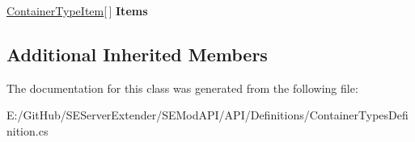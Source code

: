 \begin{DoxyCompactItemize}
\item 
\hypertarget{class_s_e_mod_a_p_i_1_1_a_p_i_1_1_definitions_1_1_container_types_definition_adcf9ddc9b999369504ad95f6d15fac98}{}\hyperlink{class_s_e_mod_a_p_i_1_1_a_p_i_1_1_definitions_1_1_container_type_item}{Container\+Type\+Item}\mbox{[}$\,$\mbox{]} {\bfseries Items}\label{class_s_e_mod_a_p_i_1_1_a_p_i_1_1_definitions_1_1_container_types_definition_adcf9ddc9b999369504ad95f6d15fac98}

\end{DoxyCompactItemize}
\subsection*{Additional Inherited Members}


The documentation for this class was generated from the following file\+:\begin{DoxyCompactItemize}
\item 
E\+:/\+Git\+Hub/\+S\+E\+Server\+Extender/\+S\+E\+Mod\+A\+P\+I/\+A\+P\+I/\+Definitions/Container\+Types\+Definition.\+cs\end{DoxyCompactItemize}
